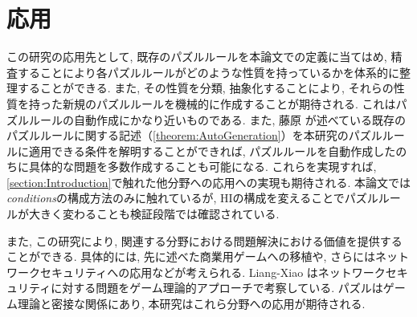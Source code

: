 \section{応用}
この研究の応用先として, 既存のパズルルールを本論文での定義に当てはめ, 精査することにより各パズルルールがどのような性質を持っているかを体系的に整理することができる. また, その性質を分類, 抽象化することにより, それらの性質を持った新規のパズルルールを機械的に作成することが期待される. これはパズルルールの自動作成にかなり近いものである. また, 藤原 \cite{Fujiwara2022}が述べている既存のパズルルールに関する記述（\cref{theorem:AutoGeneration}）を本研究のパズルルールに適用できる条件を解明することができれば, パズルルールを自動作成したのちに具体的な問題を多数作成することも可能になる. これらを実現すれば, \cref{section:Introduction}で触れた他分野への応用への実現も期待される.
本論文では\textit{conditions}の構成方法のみに触れているが, HIの構成を変えることでパズルルールが大きく変わることも検証段階では確認されている.

また, この研究により, 関連する分野における問題解決における価値を提供することができる. 具体的には, 先に述べた商業用ゲームへの移植や, さらにはネットワークセキュリティへの応用などが考えられる. Liang-Xiao \cite{Liang2013}はネットワークセキュリティに対する問題をゲーム理論的アプローチで考察している. パズルはゲーム理論と密接な関係にあり, 	本研究はこれら分野への応用が期待される.